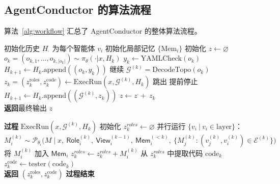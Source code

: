 \documentclass{article}
\theoremstyle{definition}
\newcommand{\errbox}[2]{\kwtagi[#1]{\texttt{\textcolor{#1}{#2}}}}
\newcommand{\PASSED}{\errbox{passColor}{PASSED}}
\begin{document}
\subsection{AgentConductor 的算法流程}\label{appendix:alg}
算法~\ref{alg:workflow} 汇总了 AgentConductor 的整体算法流程。
\begin{algorithm}[t]
    \caption{AgentConductor 的在线拓扑生成流程}
    \label{alg:workflow}
    \begin{algorithmic}[1] 
            \STATE 初始化历史 $H_{\cdot}$
            \STATE 为每个智能体 $v_i$ 初始化局部记忆 $\{ \mathrm{Mem}_i \}$
            \STATE 初始化 $z \leftarrow \varnothing$
                \STATE $o_k=(o_{k,1},\ldots,o_{k,|o_k|}) \sim \pi_\theta(\cdot|x,H_k)$
                    \STATE $y_k \leftarrow \mathrm{YAMLCheck}(o_k)$
                    \STATE $H_{k+1}\leftarrow H_{k}.\text{append}((o_k,y_k))$
                    \STATE 继续
                \ENDIF
                \STATE $\mathcal{G}^{(k)} = \mathrm{DecodeTopo}(o_k)$
                \STATE $z_k = (z_k^{\text{roles}},z_k^{\text{code}}) \leftarrow \mathrm{ExecRun}(x,\mathcal{G}^{(k)},H_k)$
                \IF{$z^{\text{code}}_k$ 中包含 \PASSED}
                    \STATE 跳出 \COMMENT 提前停止
                \ENDIF
                \STATE $H_{k+1}\leftarrow H_{k}.\text{append}((\mathcal{G}^{(k)},z_k))$
                \STATE $z \leftarrow z \  + \  z_k$
            \ENDFOR \\
            \STATE \textbf{返回}最终输出 $z$
            
        \STATE \textbf{过程} $\mathrm{ExecRun}(x,\mathcal{G}^{(k)},H_k)$
            \STATE 初始化 $z_k^{roles} \leftarrow \varnothing$
                \STATE 并行运行 $\{ v_i\ |\ v_i \in \mathrm{layer} \}$：
                \STATE \quad $M_i^{(k)} \sim \mathcal{P}_{\theta_i}\!\big(M \mid x,\ \textsf{Role}_i^{(k)},\ \textsf{View}_i^{(k-1)},\ \textsf{Mem}_i^{(<k)},\ \{M_j^{(k)}:(v_j^{(k)},v_i^{(k)})\in\mathcal{E}^{(k)}\}\big)$
                \STATE \quad 将 $M_i^{(k)}$ 加入 $\textsf{Mem}_i$
                \STATE \quad $z_k^{roles} \leftarrow z_k^{roles}+M_i^{(k)}$
            \ENDFOR
            \STATE 从 $z_k^{roles}$ 中提取代码 $\mathrm{code}_k$
            \STATE $z_k^{\mathrm{code}} \leftarrow \mathrm{tester}(\mathrm{code}_k)$ \\
            \STATE \textbf{返回} $(z_k^{\mathrm{roles}}, z_k^{\mathrm{code}})$
        \STATE \textbf{过程结束}
    \end{algorithmic}
\end{algorithm}
\end{document}
